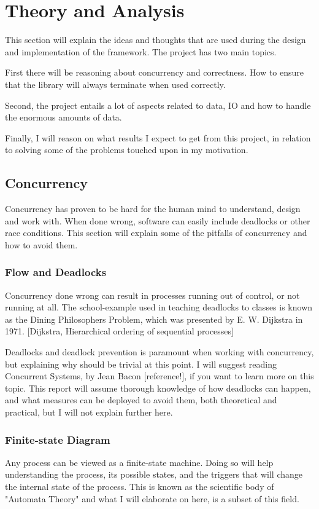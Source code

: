 \documentclass[a4paper]{article}
\begin{document}
\newpage
\section{Theory and Analysis}
This section will explain the ideas and thoughts that are used during the design and implementation of the framework.
The project has two main topics.

First there will be reasoning about concurrency and correctness. How to ensure that the
library will always terminate when used correctly.

Second, the project entails a lot of aspects related to data, IO and
how to handle the enormous amounts of data.

Finally, I will reason on what results I expect to get from this project, in relation to solving some of the problems touched upon in my motivation.


\subsection{Concurrency}
Concurrency has proven to be hard for the human mind to understand, design and work with. When done wrong, software can easily
include deadlocks or other race conditions. This section will explain some of the pitfalls of concurrency and how to avoid them.


\subsubsection{Flow and Deadlocks}
Concurrency done wrong can result in processes running out of control, or not running at all. The school-example used in teaching
deadlocks to classes is known as the Dining Philosophers Problem, which was presented by E. W. Dijkstra in 1971.
[Dijkstra, Hierarchical ordering of sequential processes]

Deadlocks and deadlock prevention is paramount when working with concurrency, but explaining why should be trivial at this point.
I will suggest reading Concurrent Systems, by Jean Bacon [reference!], if you want to learn more on this topic. This report will
assume thorough knowledge of how deadlocks can happen, and what measures can be deployed to avoid them, both theoretical and practical,
but I will not explain further here.


\subsubsection{Finite-state Diagram}
Any process can be viewed as a finite-state machine. Doing so will help understanding the process,
its possible states, and the triggers that will change the internal state of the process. This is known as the scientific
body of "Automata Theory" and what I will elaborate on here, is a subset of this field.
\end{document}
